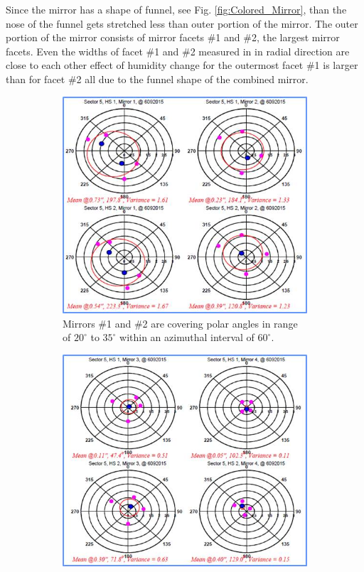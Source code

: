 Since the mirror has a shape of funnel, see Fig. \ref{fig:Colored_Mirror}, than the nose of the funnel gets stretched less than outer portion of the mirror. The outer portion of the mirror consists of mirror facets \#1 and \#2, the largest mirror facets. Even the widths of facet \#1 and \#2 measured in in radial direction are close to each other effect of humidity change for the outermost facet \#1 is larger than for facet \#2 all due to the funnel shape of the combined mirror.

\begin{figure}
\begin{subfigure}[b]{0.49\textwidth}
    \includegraphics[width=1.0\textwidth]{images/GEO_TEST_Sect5_M_1_M_2.jpg}
    \caption{Mirrors \#1 and \#2 are covering polar angles in range of $20^\circ$ to $35^\circ$  within an azimuthal interval of $60^\circ$.} \label{fig:subfig1_a}
\end{subfigure}
\hspace*{\fill} %
\begin{subfigure}[b]{0.5\textwidth}
    \includegraphics[width=1.0\linewidth]{images/GEO_TEST_Sect5_M_3_M_4.jpg}

\end{subfigure}
\end{figure}

